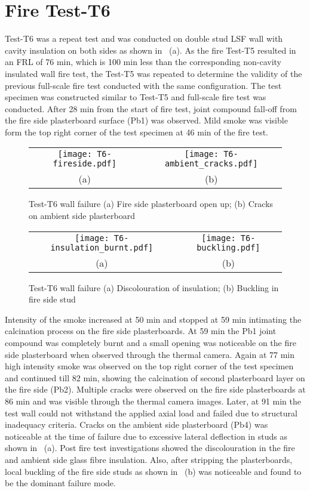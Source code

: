 \section{Fire Test-T6}

Test-T6 was a repeat test and was conducted on double stud LSF wall with cavity insulation on both sides as shown in ~(a). As the fire Test-T5 resulted in an FRL of 76 min, which is 100 min less than the corresponding non-cavity insulated wall fire test, the Test-T5 was repeated to determine the validity of the previous full-scale fire test conducted with the same configuration. The test specimen was constructed similar to Test-T5 and full-scale fire test was conducted. After 28 min from the start of fire test, joint compound fall-off from the fire side plasterboard surface (Pb1) was observed. Mild smoke was visible form the top right corner of the test specimen at 46 min of the fire test.  
\begin{figure}[!htbp]
	\centering	
		\begin{tabular}{cc}
			\texttt{[image: T6-fireside.pdf]} & \texttt{[image: T6-ambient\_cracks.pdf]} \\
			(a) & (b) \\
			\end{tabular}
		\caption{Test-T6 wall failure (a) Fire side plasterboard open up; (b) Cracks on ambient side plasterboard}
		\label{fig:T6-fireside}
\end{figure}
\begin{figure}[!htbp]
	\centering	
		\begin{tabular}{cc}
			\texttt{[image: T6-insulation\_burnt.pdf]} & \texttt{[image: T6-buckling.pdf]} \\
			(a) & (b) \\
			\end{tabular}
		\caption{Test-T6 wall failure (a) Discolouration of insulation; (b) Buckling in fire side stud}
		\label{fig:T6-failure}
\end{figure}

Intensity of the smoke increased at 50 min and stopped at 59 min intimating the calcination process on the fire side plasterboards. At 59 min the Pb1 joint compound was completely burnt and a small opening was noticeable on the fire side plasterboard when observed through the thermal camera. Again at 77 min high intensity smoke was observed on the top right corner of the test specimen and continued till 82 min, showing the calcination of second plasterboard layer on the fire side (Pb2). Multiple cracks were observed on the fire side plasterboards at 86 min and was visible through the thermal camera images. Later, at 91 min the test wall could not withstand the applied axial load and failed due to structural inadequacy criteria. Cracks on the ambient side plasterboard (Pb4) was noticeable at the time of failure due to excessive lateral deflection in studs as shown in ~(a). Post fire test investigations showed the discolouration in the fire and ambient side glass fibre insulation. Also, after stripping the plasterboards, local buckling of the fire side studs as shown in ~(b) was noticeable and found to be the dominant failure mode.

